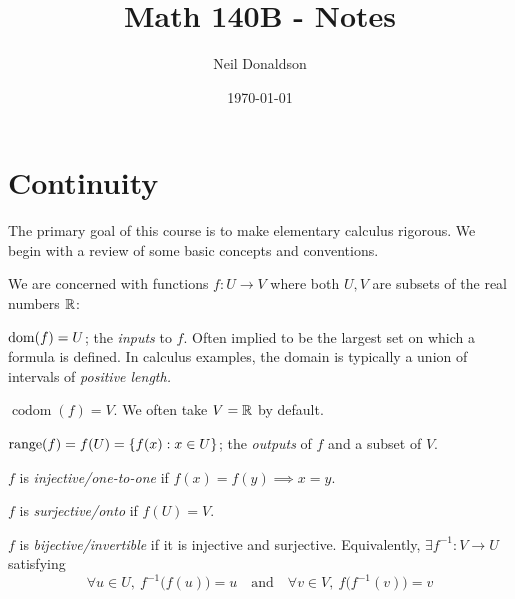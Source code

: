 \graphicspath{{1contrev/asy/}}

\title{Math 140B - Notes}
\author{Neil Donaldson}
\date{\today}
\maketitle

\thispagestyle{empty}

\section{Continuity}

The primary goal of this course is to make elementary calculus rigorous. We begin with a review of some basic concepts and conventions.




% 



We are concerned with functions $f:U\to V$ where both $U,V$ are subsets of the real numbers $\mathbb{R}$:
\begin{description}\itemsep=3pt\parsep=3pt
	\item[\normalfont\emph{Domain}] $\operatorname{dom}(f)=U$; the \emph{inputs} to $f$. Often implied to be the largest set on which a formula is defined. In calculus examples, the domain is typically a union of intervals of \emph{positive length.}
	\item[\normalfont\emph{Codomain}] $\operatorname{codom}(f)=V$. We often take $V=\mathbb{R}$ by default.
	\item[\normalfont\emph{Range}] $\operatorname{range}(f)=f(U)=\{f(x):x\in U\}$; the \emph{outputs} of $f$ and a subset of $V$.
	\item[\normalfont\emph{Injectivity}] $f$ is \emph{injective/one-to-one} if $f(x)=f(y)\implies x=y$.
	\item[\normalfont\emph{Surjectivity}] $f$ is \emph{surjective/onto} if $f(U)=V$.
	\item[\normalfont\emph{Inverses}] $f$ is \emph{bijective/invertible} if it is injective and surjective. Equivalently, $\exists f^{-1}:V\to U$ satisfying
	\[\forall u\in U,\ f^{-1}\bigl(f(u)\bigr)=u\quad\text{and}\quad \forall v\in V,\ f\bigl(f^{-1}(v)\bigr)=v\]
\end{description}

